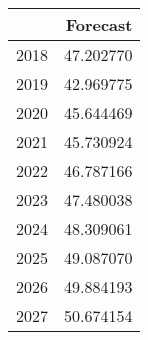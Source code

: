\begin{tabular}{lr}
\toprule
{} &   Forecast \\
\midrule
2018 &  47.202770 \\
2019 &  42.969775 \\
2020 &  45.644469 \\
2021 &  45.730924 \\
2022 &  46.787166 \\
2023 &  47.480038 \\
2024 &  48.309061 \\
2025 &  49.087070 \\
2026 &  49.884193 \\
2027 &  50.674154 \\
\bottomrule
\end{tabular}
